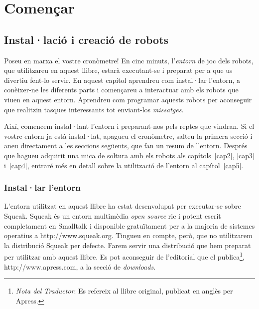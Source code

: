 \part{Començar}

\chapter{Instal·lació i creació de robots}
\label{cap1}
  
Poseu en marxa el vostre cronòmetre! En cinc minuts, l'\textit{entorn} de joc dels robots, que utilitzareu en aquest llibre, estarà executant-se i preparat per a que us divertiu fent-lo servir. En aquest capítol aprendreu com instal·lar l'entorn, a conèixer-ne les diferents parts i començareu a interactuar amb els robots que viuen en aquest entorn. Aprendreu com programar aquests robots per aconseguir que realitzin tasques interessants tot enviant-los \textit{missatges}.

Així, comencem instal·lant l'entorn i preparant-nos pels reptes que vindran. Si el vostre entorn ja està instal·lat, apagueu el cronòmetre, salteu la primera secció i aneu directament a les seccions següents, que fan un resum de l'entorn. Després que hagueu adquirit una mica de soltura amb els robots als capítols~\ref{cap2}, \ref{cap3} i~\ref{cap4}, entraré  més en detall sobre la utilització de l'entorn al capítol~\ref{cap5}.

\section{Instal·lar l'entorn}
L'entorn utilitzat en aquest llibre ha estat desenvolupat per executar-se sobre Squeak. Squeak és un entorn multimèdia \emph{open source}  ric i potent escrit completament en Smalltalk i disponible gratuïtament per a la majoria de sistemes operatius a \textsf{http://www.squeak.org}. Tingueu en compte, però, que no utilitzarem la distribució Squeak per defecte. Farem servir una distribució que hem preparat per utilitzar amb aquest llibre. Es pot aconseguir de l'editorial que el publica\footnote{\emph{Nota del Traductor}: Es refereix al llibre original, publicat en anglès per Apress.},  \textsf{http://www.apress.com}, a la secció de \emph{downloads}. 

